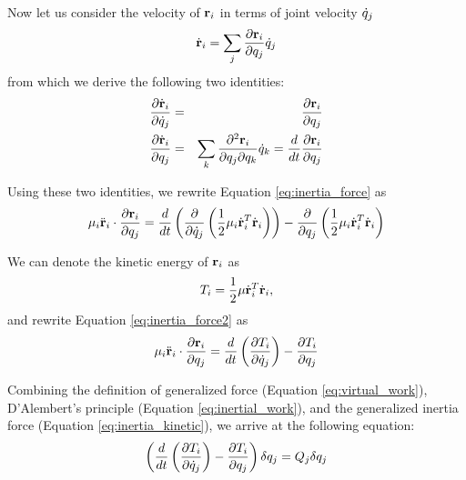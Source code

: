 Now let us consider the velocity of $\mathbf{r}_i$ in terms of
joint velocity $\dot{q}_j$
\begin{equation}
\label{eq:velocity}
\dot{\mathbf{r}}_i = \sum_j \frac{\partial
  \mathbf{r}_i}{\partial q_j} \dot{q}_j
\end{equation}
from which we derive the following two identities:
\begin{eqnarray}
\frac{\partial \dot{\mathbf{r}}_i}{\partial \dot{q}_j} &=&
\frac{\partial \mathbf{r}_i}{\partial q_j}  \\
\frac{\partial \dot{\mathbf{r}}_i}{\partial q_j} &=&
\sum_k \frac{\partial^2 \mathbf{r}_i}{\partial q_j \partial
  q_k} \dot{q}_k = \frac{d}{dt} \frac{\partial \mathbf{r}_i}{\partial q_j}
\end{eqnarray}

Using these two identities, we rewrite Equation \ref{eq:inertia_force} as
\begin{equation}
\label{eq:inertia_force2}
\mathbf{\mu}_i \ddot{\mathbf{r}}_i \cdot \frac{\partial \mathbf{r}_i}{\partial q_j}   = \frac{d}{dt} \left ( \frac{\partial}{\partial \dot{q}_j} \left( \frac{1}{2} \mathbf{\mu}_i \dot{\mathbf{r}}_i^{T} \dot{\mathbf{r}}_i\right) \right)
   - \frac{\partial}{\partial q_j} \left( \frac{1}{2} \mathbf{\mu}_i \dot{\mathbf{r}}_i^{T} \dot{\mathbf{r}}_i \right)
\end{equation}

We can denote the kinetic energy of $\mathbf{r}_i$ as
\begin{equation}\label{eq:kinetic_energy}
    T_i = \frac{1}{2} \mathbf{\mu} \dot{\mathbf{r}}_i^{T}
    \dot{\mathbf{r}}_i,
\end{equation}
and rewrite Equation \ref{eq:inertia_force2} as
\begin{equation}\label{eq:inertia_kinetic}
    \mathbf{\mu}_i \ddot{\mathbf{r}}_i \cdot \frac{\partial \mathbf{r}_i}{\partial
    q_j} = \frac{d}{dt} \left( \frac{\partial T_i}{\partial
    \dot{q}_j}\right) - \frac{\partial T_i}{\partial q_j}
\end{equation}

Combining the definition of generalized force (Equation
\ref{eq:virtual_work}), D'Alembert's principle (Equation
\ref{eq:inertial_work}), and the generalized inertia force (Equation
\ref{eq:inertia_kinetic}), we arrive at the following equation:
\begin{equation}\label{eq:dynamic_equil}
    \left ( \frac{d}{dt} \left( \frac{\partial T_i}{\partial \dot{q}_j} \right) - \frac{\partial T_i}{\partial
    q_j}\right ) \delta q_j = Q_{j} \delta
    q_j
\end{equation}

